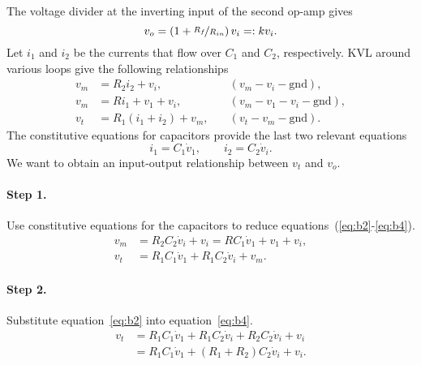The voltage divider at the inverting input of the second op-amp gives 
%
\begin{equation}
    v_o = \left(1+\nicefrac{R_f}{R_{in}}\right)v_i =: kv_i.
    \label{eq:b1}
\end{equation}
%
Let $i_1$ and $i_2$ be the currents that flow over $C_1$ and $C_2$,
respectively. KVL around various loops give the following relationships
%
\begin{align}
    \label{eq:b2} v_m &= R_2i_2 + v_i, \quad &(v_m - v_i - \text{gnd}),  \\
    \label{eq:b3} v_m &= Ri_1 + v_1 + v_i, \quad &(v_m - v_1 - v_i - \text{gnd}), \\
    \label{eq:b4} v_t &= R_1(i_1 + i_2) + v_m, \quad &(v_t - v_m - \text{gnd}).
\end{align}
% 
The constitutive equations for capacitors provide the last two relevant
equations \[ i_1 = C_1 \dot{v}_1, \qquad i_2 = C_2 \dot{v}_i. \] We want to
obtain an input-output relationship between $v_t$ and $v_o$.

\paragraph{Step 1.} Use constitutive equations for the capacitors to reduce
equations~(\ref{eq:b2}-\ref{eq:b4}).
%
\begin{align*}
    v_m &= R_2C_2\dot{v}_i + v_i = RC_1\dot{v}_1 + v_1 + v_i, \\
    v_t &= R_1C_1\dot{v}_1 + R_1C_2\dot{v}_i + v_m.
\end{align*}

\paragraph{Step 2.} Substitute equation~\eqref{eq:b2} into
equation~\eqref{eq:b4}.
\begin{align*} 
    v_t &= R_1C_1\dot{v}_1 + R_1C_2\dot{v}_i + R_2C_2\dot{v}_i + v_i \\ 
        &= R_1C_1\dot{v}_1 + (R_1+R_2)C_2\dot{v}_i + v_i.
\end{align*}

